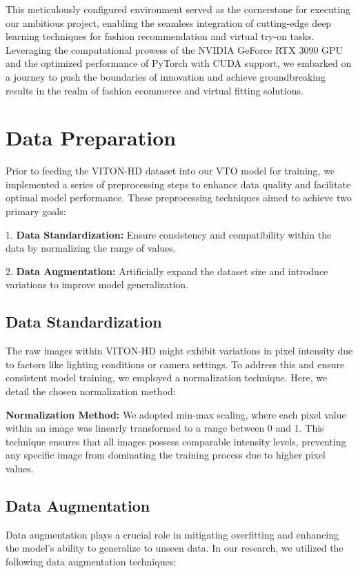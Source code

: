 This meticulously configured environment served as the cornerstone for executing our ambitious project, enabling the seamless integration of cutting-edge deep learning techniques for fashion recommendation and virtual try-on tasks. Leveraging the computational prowess of the NVIDIA GeForce RTX 3090 GPU and the optimized performance of PyTorch with CUDA support, we embarked on a journey to push the boundaries of innovation and achieve groundbreaking results in the realm of fashion ecommerce and virtual fitting solutions.

\section{Data Preparation}

Prior to feeding the VITON-HD dataset into our VTO model for training, we implemented a series of preprocessing steps to enhance data quality and facilitate optimal model performance. These preprocessing techniques aimed to achieve two primary goals:

1. \textbf{Data Standardization:} Ensure consistency and compatibility within the data by normalizing the range of values.

2. \textbf{Data Augmentation:} Artificially expand the dataset size and introduce variations to improve model generalization.

\subsection{Data Standardization}

The raw images within VITON-HD might exhibit variations in pixel intensity due to factors like lighting conditions or camera settings. To address this and ensure consistent model training, we employed a normalization technique. Here, we detail the chosen normalization method:

\textbf{Normalization Method:} We adopted min-max scaling, where each pixel value within an image was linearly transformed to a range between 0 and 1. This technique ensures that all images possess comparable intensity levels, preventing any specific image from dominating the training process due to higher pixel values.

\subsection{Data Augmentation}

Data augmentation plays a crucial role in mitigating overfitting and enhancing the model's ability to generalize to unseen data. In our research, we utilized the following data augmentation techniques:

